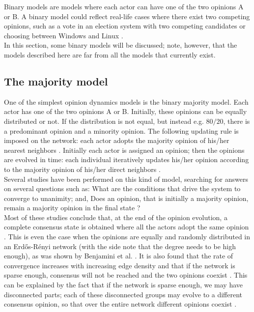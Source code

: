 \documentclass[11 pt , letterpaper , twoside , openright]{book}
\begin{document}
Binary models are models where each actor can have one of the two opinions A or B. A binary model could reflect real-life cases where there exist two competing opinions, such as a vote in an election system with two competing candidates or choosing between Windows and Linux \cite{Nguyen2020}.\\
\newline
In this section, some binary models will be discussed; note, however, that the models described here are far from all the models that currently exist.

\subsection{The majority model}\label{majModel}

One of the simplest opinion dynamics models is the binary majority model. Each actor has one of the two opinions A or B. Initially, these opinions can be equally distributed or not. If the distribution is not equal, but instead e.g. $80/20$, there is a predominant opinion and a minority opinion. The following updating rule is imposed on the network: each actor adopts the majority opinion of his/her nearest neighbors \cite{Nguyen2020}. Initially each actor is assigned an opinion; then the opinions are evolved in time: each individual iteratively updates his/her opinion according to the majority opinion of his/her direct neighbors \cite{Nguyen2020}.\\
\newline
Several studies have been performed on this kind of model, searching for answers on several questions such as: What are the conditions that drive the system to converge to unanimity; and, Does an opinion, that is initially a majority opinion, remain a majority opinion in the final state \cite{Nguyen2020}? \\
\newline
Most of these studies conclude that, at the end of the opinion evolution, a complete consensus state is obtained where all the actors adopt the same opinion \cite{Nguyen2020}. This is even the case when the opinions are equally and randomly distributed in an Erd\H{o}s-R\'{e}nyi network (with the side note that the degree needs to be high enough), as was shown by Benjamini et al. \cite{Benjamini2016}. It is also found that the rate of convergence increases with increasing edge density and that if the network is sparse enough, consensus will not be reached and the two opinions coexist \cite{Nguyen2020}. This can be explained by the fact that if the network is sparse enough, we may have disconnected parts; each of these disconnected groups may evolve to a different consensus opinion, so that over the entire network different opinions coexist \cite{Nguyen2020}.
\end{document}
